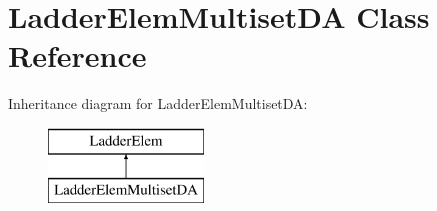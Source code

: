 \hypertarget{class_ladder_elem_multiset_d_a}{\section{Ladder\-Elem\-Multiset\-D\-A Class Reference}
\label{class_ladder_elem_multiset_d_a}
}
Inheritance diagram for Ladder\-Elem\-Multiset\-D\-A\-:\begin{figure}[H]
\begin{center}
\leavevmode
\includegraphics[height=2.000000cm]{class_ladder_elem_multiset_d_a}
\end{center}
\end{figure}
